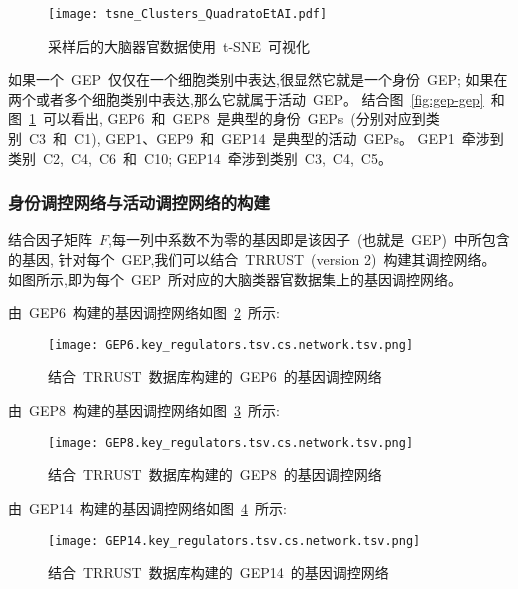 \begin{figure}[!htbp]
    \centering
    \texttt{[image: tsne\_Clusters\_QuadratoEtAI.pdf]}
    \caption{
    采样后的大脑器官数据使用~t-SNE~可视化
    }
    \label{fig:gep-tsne}
\end{figure}

如果一个~GEP~仅仅在一个细胞类别中表达,很显然它就是一个身份~GEP;
如果在两个或者多个细胞类别中表达,那么它就属于活动~GEP。
结合图~\ref{fig:gep-gep}~和图~\ref{fig:gep-tsne}~可以看出, 
GEP6~和~GEP8~是典型的身份~GEPs~(分别对应到类别~C3~和~C1), GEP1、GEP9~和~GEP14~是典型的活动~GEPs。
GEP1~牵涉到类别~C2,~C4,~C6~和~C10; GEP14~牵涉到类别~C3,~C4,~C5。

\subsubsection{身份调控网络与活动调控网络的构建}
结合因子矩阵~$F$,每一列中系数不为零的基因即是该因子~(也就是~GEP)~中所包含的基因,
针对每个~GEP,我们可以结合~TRRUST~(version 2)~构建其调控网络。
如图所示,即为每个~GEP~所对应的大脑类器官数据集上的基因调控网络。

由~GEP6~构建的基因调控网络如图~\ref{fig:gep-grn-gep6}~所示:
\begin{figure}[!htbp]
    \centering
    \texttt{[image: GEP6.key\_regulators.tsv.cs.network.tsv.png]}
    \caption{
    结合~TRRUST~数据库构建的~GEP6~的基因调控网络
    }
    \label{fig:gep-grn-gep6}
\end{figure}

由~GEP8~构建的基因调控网络如图~\ref{fig:gep-grn-gep8}~所示:
\begin{figure}[!htbp]
    \centering
    \texttt{[image: GEP8.key\_regulators.tsv.cs.network.tsv.png]}
    \caption{
    结合~TRRUST~数据库构建的~GEP8~的基因调控网络
    }
    \label{fig:gep-grn-gep8}
\end{figure}

由~GEP14~构建的基因调控网络如图~\ref{fig:gep-grn-gep14}~所示:
\begin{figure}[!htbp]
    \centering
    \texttt{[image: GEP14.key\_regulators.tsv.cs.network.tsv.png]}
    \caption{
    结合~TRRUST~数据库构建的~GEP14~的基因调控网络
    }
    \label{fig:gep-grn-gep14}
\end{figure}

